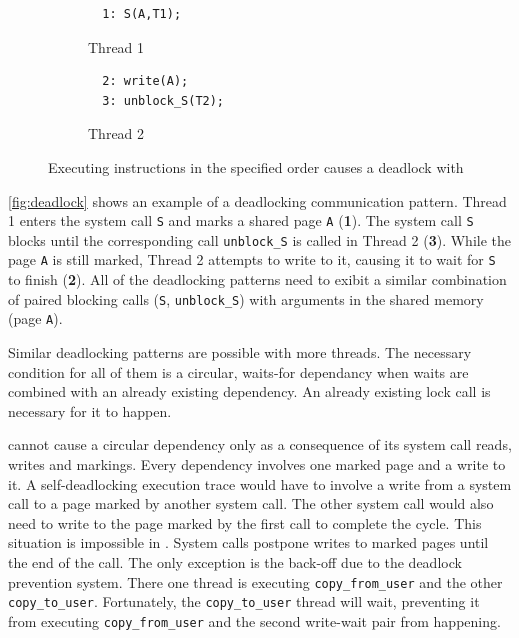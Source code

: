 \begin{figure}
  \centering
  \begin{subfigure}[b]{0.45\linewidth}
  \begin{minipage}{\linewidth}
  \begin{lstlisting}
  1: S(A,T1);  
  \end{lstlisting}
  \end{minipage}
  \caption{Thread 1}
  \end{subfigure}
  \hfill
  \begin{subfigure}[b]{0.45\linewidth}
  \begin{minipage}{\linewidth}
  \begin{lstlisting}
  2: write(A);
  3: unblock_S(T2);
  \end{lstlisting}  
  \end{minipage}
  \caption{Thread 2}
  \end{subfigure}
  \caption{Executing instructions in the specified order causes a deadlock with \sysname}
  \label{fig:deadlock}
\end{figure}


\autoref{fig:deadlock} shows an example of a deadlocking communication pattern. Thread
1 enters the system call \texttt{S} and marks a shared page \texttt{A}
(\textbf{1}). The system call \texttt{S} blocks until the corresponding call
\texttt{unblock\_S} is called in Thread 2 (\textbf{3}). While the page
\texttt{A} is still marked, Thread 2 attempts to write to it, causing it to wait
for \texttt{S} to finish (\textbf{2}). All of the deadlocking patterns need to
exibit a similar combination of paired blocking calls (\texttt{S},
\texttt{unblock\_S}) with arguments in the shared memory (page \texttt{A}).

Similar deadlocking patterns are possible with more threads. The necessary
condition for all of them is a circular, waits-for dependancy when \sysname
waits are combined with an already existing dependency. An already
existing lock call is necessary for it to happen.

\sysname cannot cause a circular dependency only as a consequence of its system
call reads, writes and markings. Every dependency involves one marked page and a
write to it. A self-deadlocking execution trace would have to involve a write
from a system call to a page marked by another system call. The other system
call would also need to write to the page marked by the first call to complete
the cycle. This situation is impossible in \sysname. System calls postpone
writes to marked pages until the end of the call. The only exception is the
back-off due to the deadlock prevention system. There one thread is executing
\texttt{copy\_from\_user} and the other \texttt{copy\_to\_user}. Fortunately,
the \texttt{copy\_to\_user} thread will wait, preventing it from executing
\texttt{copy\_from\_user} and the second write-wait pair from happening.

